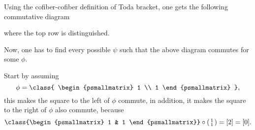 \begin{example}
	Using the cofiber-cofiber definition of Toda bracket, one gets the following commutative diagram
	\begin{center}
	\end{center}
	where the top row is distinguished.

	Now, one has to find every possible \( \psi \) such that the above diagram commutes for some \( \phi \).

	Start by assuming
	\[ 
		\phi = \class{
			\begin{psmallmatrix}
				1 \\
				1
			\end{psmallmatrix}
		},
	\]
	this makes the square to the left of \( \phi \) commute, in addition, it makes the square to the right of \( \phi \) also commute, because
	\[
		\class{\begin{psmallmatrix} 1 & 1 \end{psmallmatrix}} \circ
		\begin{psmallmatrix}
			1 \\
			1
		\end{psmallmatrix}
		=
		[2] = [0].
	\]


\end{example}
